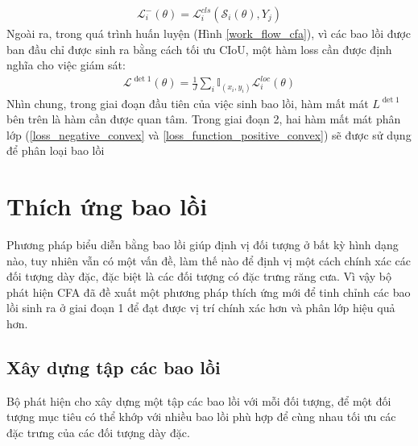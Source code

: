 \documentclass[12pt,a4paper,openany,oneside]{report}
\begin{document}
\begin{align} \label{loss_negative_convex}
	\mathcal{L}_i^{-}(\theta)=\mathcal{L}_i^{c l s}\left(\mathcal{S}_i(\theta), Y_j\right)
\end{align}
Ngoài ra, trong quá trình huấn luyện (Hình \ref{work_flow_cfa}), vì các bao lồi được ban đầu chỉ được sinh ra bằng cách tối ưu CIoU, một hàm loss cần được định nghĩa cho việc giám sát:
\begin{align} \label{loss_det_1}
	\mathcal{L}^{\operatorname{det} 1}(\theta)=\frac{1}{J} \sum_i \mathbb{I}_{\left(x_i, y_i\right)} \mathcal{L}_i^{l o c}(\theta)
\end{align}
Nhìn chung, trong giai đoạn đầu tiên của việc sinh bao lồi, hàm mất mát $L^{\operatorname{det} 1}$ bên trên là hàm cần được quan tâm. Trong giai đoạn 2, hai hàm mất mát phân lớp (\ref{loss_negative_convex} và \ref{loss_function_positive_convex}) sẽ được sử dụng để phân loại bao lồi
\section{Thích ứng bao lồi}
Phương pháp biểu diễn bằng bao lồi giúp định vị đối tượng ở bất kỳ hình dạng nào, tuy nhiên vẫn có một vấn đề, làm thế nào để định vị một cách chính xác các đối tượng dày đặc, đặc biệt là các đối tượng có đặc trưng răng cưa. Vì vậy bộ phát hiện CFA đã đề xuất một phương pháp thích ứng mới để tinh chỉnh các bao lồi sinh ra ở giai đoạn 1 để đạt được vị trí chính xác hơn và phân lớp hiệu quả hơn.
\subsection{Xây dựng tập các bao lồi}
Bộ phát hiện cho xây dựng một tập các bao lồi với mỗi đối tượng, để một đối tượng mục tiêu có thể khớp với nhiều bao lồi phù hợp để cùng nhau tối ưu các đặc trưng của các đối tượng dày đặc.
\end{document}
